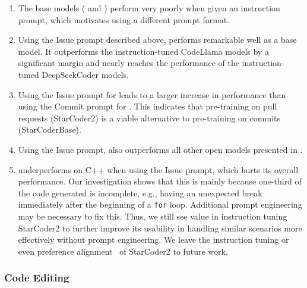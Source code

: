 \documentclass[10pt]{article} %
\begin{document}
\begin{enumerate}
    \item The base models ( and ) perform very poorly when given an instruction prompt, which motivates using a different prompt format.

    \item Using the Issue prompt described above,  performs remarkable well as a base model. It outperforms the instruction-tuned CodeLlama models by a significant margin and nearly reaches the performance of the instruction-tuned DeepSeekCoder models.

    \item Using the Issue prompt for  leads to a larger increase in performance than using the Commit prompt for . This indicates that pre-training on pull requests (StarCoder2) is a viable alternative to pre-training on commits (StarCoderBase).

    \item Using the Issue prompt,  also outperforms all other open models presented in \citet{muennighoff2023octopack}.

    \item {} underperforms on C++ when using the Issue prompt, which hurts its overall performance. Our investigation shows that this is mainly because one-third of the code generated is incomplete, e.g., having an unexpected break immediately after the beginning of a \texttt{for} loop. Additional prompt engineering may be necessary to fix this. Thus, we still see value in instruction tuning StarCoder2 to further improve its usability in handling similar scenarios more effectively without prompt engineering. We leave the instruction tuning or even preference alignment~\citep{christiano2017deep,ethayarajh2024kto} of StarCoder2 to future work.

\end{enumerate}

\subsubsection{Code Editing}
\end{document}
